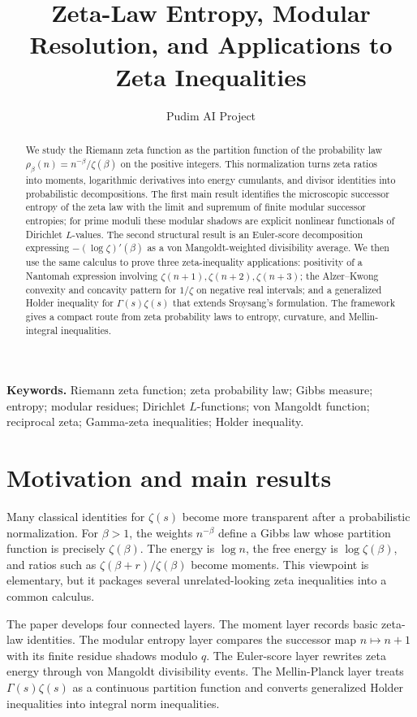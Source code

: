 \documentclass[11pt]{article}
\title{Zeta-Law Entropy, Modular Resolution, and Applications to Zeta Inequalities}
\author{Pudim AI Project}
\date{}
\numberwithin{equation}{section}
\theoremstyle{definition}
\theoremstyle{remark}
\newcommand{\1}{\mathbf 1}
\begin{document}
\maketitle

\begin{abstract}
We study the Riemann zeta function as the partition function of the probability law \(\rho_\beta(n)=n^{-\beta}/\zeta(\beta)\) on the positive integers.  This normalization turns zeta ratios into moments, logarithmic derivatives into energy cumulants, and divisor identities into probabilistic decompositions.  The first main result identifies the microscopic successor entropy of the zeta law with the limit and supremum of finite modular successor entropies; for prime moduli these modular shadows are explicit nonlinear functionals of Dirichlet \(L\)-values.  The second structural result is an Euler-score decomposition expressing \(-(\log\zeta)'(\beta)\) as a von Mangoldt-weighted divisibility average.  We then use the same calculus to prove three zeta-inequality applications: positivity of a Nantomah expression involving \(\zeta(n+1),\zeta(n+2),\zeta(n+3)\); the Alzer--Kwong convexity and concavity pattern for \(1/\zeta\) on negative real intervals; and a generalized Holder inequality for \(\Gamma(s)\zeta(s)\) that extends Sroysang's formulation.  The framework gives a compact route from zeta probability laws to entropy, curvature, and Mellin-integral inequalities.
\end{abstract}

\noindent\textbf{Keywords.} Riemann zeta function; zeta probability law; Gibbs measure; entropy; modular residues; Dirichlet \(L\)-functions; von Mangoldt function; reciprocal zeta; Gamma-zeta inequalities; Holder inequality.

\section{Motivation and main results}

Many classical identities for \(\zeta(s)\) become more transparent after a probabilistic normalization.  For \(\beta>1\), the weights \(n^{-\beta}\) define a Gibbs law whose partition function is precisely \(\zeta(\beta)\).  The energy is \(\log n\), the free energy is \(\log\zeta(\beta)\), and ratios such as \(\zeta(\beta+r)/\zeta(\beta)\) become moments.  This viewpoint is elementary, but it packages several unrelated-looking zeta inequalities into a common calculus.

The paper develops four connected layers.  The moment layer records basic zeta-law identities.  The modular entropy layer compares the successor map \(n\mapsto n+1\) with its finite residue shadows modulo \(q\).  The Euler-score layer rewrites zeta energy through von Mangoldt divisibility events.  The Mellin-Planck layer treats \(\Gamma(s)\zeta(s)\) as a continuous partition function and converts generalized Holder inequalities into integral norm inequalities.
\end{document}
